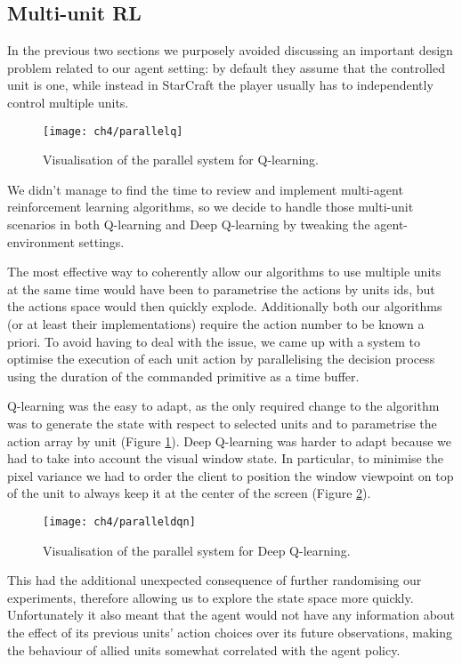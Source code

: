 \subsection{Multi-unit RL}

In the previous two sections we purposely avoided discussing an important design
problem related to our agent setting: by default they assume that the controlled
unit is one, while instead in StarCraft the player usually has to independently
control multiple units.

\begin{figure}[h]
    \centering
    \texttt{[image: ch4/parallelq]}
    \caption{Visualisation of the parallel system for Q-learning.}
    \label{fig:parallelq}
\end{figure}

We didn't manage to find the time to review and implement multi-agent
reinforcement learning algorithms, so we decide to handle those multi-unit
scenarios in both Q-learning and Deep Q-learning by tweaking the
agent-environment settings.

The most effective way to coherently allow our algorithms to use multiple units
at the same time would have been to parametrise the actions by units ids, but
the actions space would then quickly explode. Additionally both our algorithms
(or at least their implementations) require the action number to be known a
priori. To avoid having to deal with the issue, we came up with a system to
optimise the execution of each unit action by parallelising the decision process
using the duration of the commanded primitive as a time buffer.

Q-learning was the easy to adapt, as the only required change to the algorithm
was to generate the state with respect to selected units and to parametrise
the action array by unit (Figure \ref{fig:parallelq}). Deep Q-learning was
harder to adapt because we had to take into account the visual window state. In
particular, to minimise the pixel variance we had to order the client to
position the window viewpoint on top of the unit to always keep it at the center
of the screen (Figure \ref{fig:paralleldqn}).

\begin{figure}[h]
    \centering
    \texttt{[image: ch4/paralleldqn]}
    \caption{Visualisation of the parallel system for Deep Q-learning.}
    \label{fig:paralleldqn}
\end{figure}

This had the additional unexpected consequence of further randomising our
experiments, therefore allowing us to explore the state space more quickly.
Unfortunately it also meant that the agent would not have any information about
the effect of its previous units' action choices over its future observations,
making the behaviour of allied units somewhat correlated with the agent policy.

